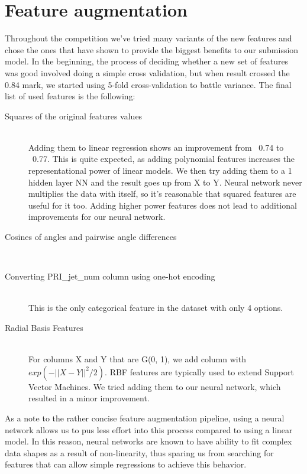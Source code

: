 \documentclass[10pt,conference,compsocconf]{IEEEtran}
\begin{document}
\section{Feature augmentation}
Throughout the competition we've tried many variants of the new features and chose the ones that have shown to provide the biggest benefits to our submission model. In the beginning, the process of deciding whether a new set of features was good involved doing a simple cross validation, but when result crossed the 0.84 mark, we started using 5-fold cross-validation to battle variance. The final list of used features is the following:
\begin{description}
\item[Squares of the original features values] \ \\
	Adding them to linear regression shows an improvement from ~0.74 to ~0.77. This is quite expected, as adding polynomial features increases the representational power of linear models. We then try adding them to a 1 hidden layer NN and the result goes up from X to Y. Neural network never multiplies the data with itself, so it's reasonable that squared features are useful for it too. Adding higher power features does not lead to additional improvements for our neural network.
	
\item[Cosines of angles and pairwise angle differences] \ \\
	
\item[Converting PRI\_jet\_num column using one-hot encoding] \ \\
	This is the only categorical feature in the dataset with only 4 options.
	
\item[Radial Basis Features] \ \\
	For columns X and Y that are G(0, 1), we add column with $exp(-||X-Y||^2/2)$. 
	RBF features are typically used to extend Support Vector Machines. We tried adding them to our neural network, which resulted in a minor improvement.
\end{description}

As a note to the rather concise feature augmentation pipeline, using a neural network allows us to pus less effort into this process compared to using a linear model. In this reason, neural networks are known to have ability to fit complex data shapes as a result of non-linearity, thus sparing us from searching for features that can allow simple regressions to achieve this behavior.
\end{document}
